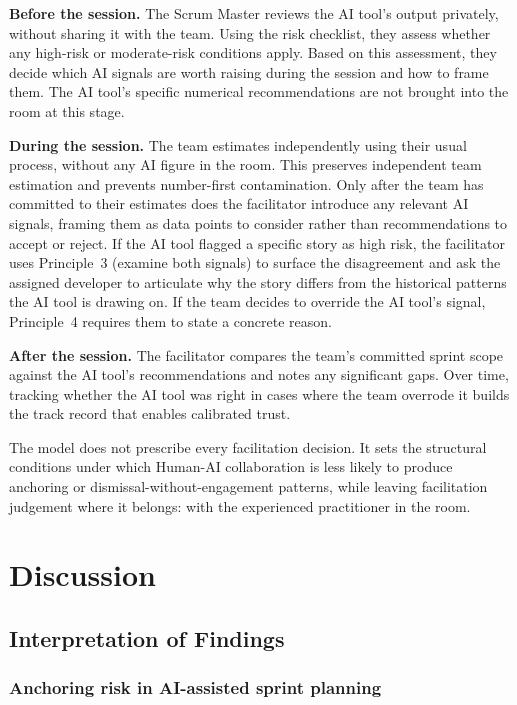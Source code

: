\documentclass[a4paper,twoside]{bth}
\begin{document}
\textbf{Before the session.} The Scrum Master reviews the AI tool's output privately, without sharing it with the team. Using the risk checklist, they assess whether any high-risk or moderate-risk conditions apply. Based on this assessment, they decide which AI signals are worth raising during the session and how to frame them. The AI tool's specific numerical recommendations are not brought into the room at this stage.

\textbf{During the session.} The team estimates independently using their usual process, without any AI figure in the room. This preserves independent team estimation and prevents number-first contamination. Only after the team has committed to their estimates does the facilitator introduce any relevant AI signals, framing them as data points to consider rather than recommendations to accept or reject. If the AI tool flagged a specific story as high risk, the facilitator uses Principle~3 (examine both signals) to surface the disagreement and ask the assigned developer to articulate why the story differs from the historical patterns the AI tool is drawing on. If the team decides to override the AI tool's signal, Principle~4 requires them to state a concrete reason.

\textbf{After the session.} The facilitator compares the team's committed sprint scope against the AI tool's recommendations and notes any significant gaps. Over time, tracking whether the AI tool was right in cases where the team overrode it builds the track record that enables calibrated trust.

The model does not prescribe every facilitation decision. It sets the structural conditions under which Human-AI collaboration is less likely to produce anchoring or dismissal-without-engagement patterns, while leaving facilitation judgement where it belongs: with the experienced practitioner in the room.

\chapter{Discussion}
\label{chp:discussion}

\section{Interpretation of Findings}

\subsection{Anchoring risk in AI-assisted sprint planning}
\end{document}
